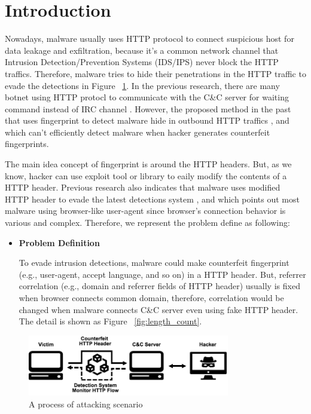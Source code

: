 \section{Introduction}

Nowadays, malware usually uses HTTP protocol to connect suspicious host for data leakage and exfiltration, because it's a common network channel that Intrusion Detection/Prevention Systems (IDS/IPS) never block the HTTP traffics. Therefore, malware tries to hide their penetrations in the HTTP traffic to evade the detections in Figure ~\ref{fig:attack}. In the previous research, there are many botnet using HTTP protocl to communicate with the C\&C server for waiting command instead of IRC channel \cite{gu2008botsniffer}. However, the proposed method in the past that uses fingerprint to detect malware hide in outbound HTTP traffics \cite{bortolameotti2017decanter}, and which can't efficiently detect malware when hacker generates counterfeit fingerprints.  

The main idea concept of fingerprint is around the HTTP headers. But, as we know, hacker can use exploit tool or library to eaily modify the contents of a HTTP header. Previous research also indicates that malware uses modified HTTP header to evade the latest detections system \cite{grill2014malware}, and which points out most malware using browser-like user-agent since browser's connection behavior is various and complex. Therefore, we represent the problem define as following:

\begin{itemize}

\item {\bf Problem Definition}

To evade intrusion detections, malware could make counterfeit fingerprint (e.g., user-agent, accept language, and so on) in a HTTP header. But, referrer correlation (e.g., domain and referrer fields of HTTP header) usually is fixed when browser connects common domain, therefore, correlation would be changed when malware connects C\&C server even using fake HTTP header. The detail is shown as Figure ~\ref{fig:length_count}.

\end{itemize}

\begin{figure}[!t]
\centering
\includegraphics[width=250pt]{image/attack.png}
\caption{A process of attacking scenario}
\label{fig:attack}
\end{figure}


